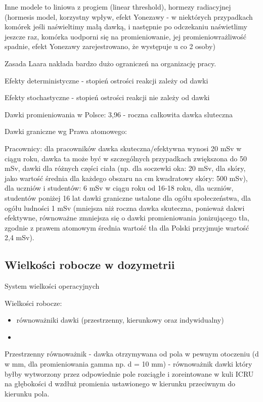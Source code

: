 \documentclass{article}
\begin{document}
Inne modele to liniowa z progiem (linear threshold), hormezy radiacyjnej (hormesis model, korzystny wpływ, efekt Yonezawy - w niektórych przypadkach komórek jeśli naświeltimy małą dawką, i następnie po odczekaniu naświetlimy jeszcze raz, komórka uodporni się na promieniowanie, jej promieniowrażliwość spadnie, efekt Yonezawy zarejestrowano, że występuje u co 2 osoby) 

Zasada Laara nakłada bardzo dużo ograniczeń na organizację pracy.

Efekty deterministyczne - stopień ostrości reakcji zależy od dawki

Efekty stochastyczne - stopień ostrości reakcji nie zależy od dawki

Dawki promieniowania w Polsce: 3,96 - roczna całkowita dawka sluteczna

Dawki graniczne wg Prawa atomowego:

Pracownicy: dla pracowników dawka skuteczna\slash efektywna wynosi 20 mSv w ciągu roku, dawka ta może być w szczególnych przypadkach zwiększona do 50 mSv, dawki dla różnych części ciała (np. dla soczewki oka: 20 mSv, dla skóry, jako wartość średnia dla każdego obszaru na cm kwadratowy skóry: 500 mSv), dla uczniów i studentów: 6 mSv w ciągu roku od 16-18 roku, dla uczniów, studentów poniżej 16 lat dawki graniczne ustalone dla ogółu społeczeństwa, dla ogółu ludności 1 mSv (mniejsza niż roczna dawka skuteczna, ponieważ dakwi efektywne, równoważne zmniejsza się o dawki promieniowania jonizującego tła, zgodnie z prawem atomowym średnia wartość tła dla Polski przyjmuje wartość 2,4 mSv).

\subsection{Wielkości robocze w dozymetrii}

System wielkości operacyjnych

Wielkości robocze:
\begin{itemize}
    \item równoważniki dawki (przestrzenny, kierunkowy oraz indywidualny)
    \item 
\end{itemize}

Przestrzenny równoważnik - dawka otrzymywana od pola w pewnym otoczeniu (d w mm, dla promieniowania gamma np. d = 10 mm) - równoważnik dawki który byłby wytworzony przez odpowiednie pole rozciągłe i zoreintowane w kuli ICRU na głębokości d wzdłuż promienia ustawionego w kierunku przeciwnym do kierunku pola.
\end{document}

